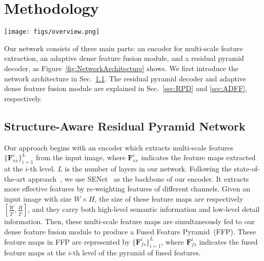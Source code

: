\documentclass{article}
\newcommand{\exF}{\mathbf{F}_{ex}}
\newcommand{\fsF}{\mathbf{F}_{fs}}
\begin{document}
 	\section{Methodology}
\label{sec:method}

\begin{figure*}[ht]
	\centering 
	\texttt{[image: figs/overview.png]}
	\caption{The network architecture. Our Structure-Aware Residual Pyramid Network consists of an encoder which extracts multi-scale visual features, a Residual Pyramid Decoder (RPD) which progressively infers depth maps in a coarse-to-fine manner, and an Adaptive Dense Feature Fusion (ADFF) module for dense feature fusion. The residual pyramid effectively adds structure details in each level based on the scene layout predicted at a coarser level. }
	\label{fig:NetworkArchitecture}
\end{figure*}

Our network consists of three main parts: an encoder for multi-scale feature extraction, an adaptive dense feature fusion module, and a residual pyramid decoder, as Figure~\ref{fig:NetworkArchitecture} shows.
We first introduce the network architecture in Sec.~\ref{sec:network}. The residual pyramid decoder and adaptive dense feature fusion module are explained in Sec.~\ref{sec:RPD} and \ref{sec:ADFF}, respectively. 

\subsection{Structure-Aware Residual Pyramid Network}
\label{sec:network}

Our approach begins with an encoder which extracts multi-scale features $\{\exF^{i}\}_{i=1}^L$ from the input image, where $\exF^{i}$ indicates the feature maps extracted at the $i$-th level. $L$ is the number of layers in our network. Following the state-of-the-art approach~\cite{hu2019revisiting}, we use SENet~\cite{hu2018squeeze} as the backbone of our encoder. It extracts more effective features by re-weighting features of different channels. Given an input image with size $W \times H$, the size of these feature maps are respectively $[\frac{W}{2^i},\frac{H}{2^i}]$, and they carry both high-level semantic information and low-level detail information. 
Then, these multi-scale feature maps are simultaneously fed to our dense feature fusion module to produce a Fused Feature Pyramid~(FFP). 
These feature maps in FFP are represented by $\{\fsF^i\}_{i=1}^L$, where $\fsF^i$ indicates the fused feature maps at the $i$-{th} level of the pyramid of fused features. 
\end{document}
